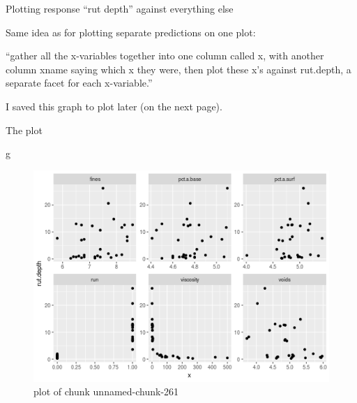 \documentclass[ignorenonframetext,]{beamer}
\newenvironment{Shaded}{\begin{snugshade}}{\end{snugshade}}
\newcommand{\DataTypeTok}[1]{\textcolor[rgb]{0.13,0.29,0.53}{#1}}
\newcommand{\KeywordTok}[1]{\textcolor[rgb]{0.13,0.29,0.53}{\textbf{#1}}}
\newcommand{\NormalTok}[1]{#1}
\newcommand{\OperatorTok}[1]{\textcolor[rgb]{0.81,0.36,0.00}{\textbf{#1}}}
\newcommand{\StringTok}[1]{\textcolor[rgb]{0.31,0.60,0.02}{#1}}
\begin{document}
\begin{frame}[fragile]{Plotting response ``rut depth'' against
everything else}
\protect\hypertarget{plotting-response-rut-depth-against-everything-else}{}

Same idea as for plotting separate predictions on one plot:

\begin{Shaded}
\end{Shaded}

``gather all the x-variables together into one column called x, with
another column xname saying which x they were, then plot these x's
against rut.depth, a separate facet for each x-variable.''

I saved this graph to plot later (on the next page).

\end{frame}

\begin{frame}[fragile]{The plot}
\protect\hypertarget{the-plot-2}{}

\begin{Shaded}
\begin{Highlighting}[]
\NormalTok{g}
\end{Highlighting}
\end{Shaded}

\begin{figure}
\centering
\includegraphics{figure/unnamed-chunk-261-1.png}
\caption{plot of chunk unnamed-chunk-261}
\end{figure}

\end{frame}
\end{document}
